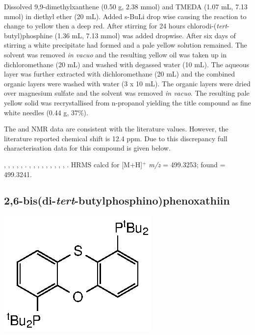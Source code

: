 Dissolved 9,9-dimethylxanthene (0.50 g, 2.38 mmol) and \gls{TMEDA} (1.07 mL, 7.13 mmol) in diethyl ether (20 mL).  Added s-BuLi drop wise causing the reaction to change to yellow then a deep red.  After stirring for 24 hours chlorodi-(\emph{tert}-butyl)phosphine (1.36 mL, 7.13 mmol) was added dropwise.  After six days of stirring a white precipitate had formed and a pale yellow solution remained.  The solvent was removed \emph{in vacuo} and the resulting yellow oil was taken up in dichloromethane (20 mL) and washed with degassed water (10 mL).  The aqueous layer was further extracted with dichloromethane (20 mL) and the combined organic layers were washed with water (3 x 10 mL).  The organic layers were dried over magnesium sulfate and the solvent was removed \emph{in vacuo}.  The resulting pale yellow solid was recrystallised from n-propanol yielding the title compound as fine white needles (0.44 g, 37\%).

The \proton{} and \carbon{} NMR data are consistent with the literature values.\cite{Mispelaere2005}  However, the literature reported \phosphorus{} chemical shift is 12.4 ppm.  Due to this discrepancy full characterisation data for this compound is given below.

,
,
,
,
,
.
,
,
,
,
,
,
,
,
,
.
HRMS calcd for  [M+H]$^+$ \emph{m/z} = 499.3253; found = 499.3241.



\subsection*{2,6-bis(di-\emph{tert}-butylphosphino)phenoxathiin}

\begin{structure}[h]
\begin{center}
\includegraphics{../Structures/Transthixantphos.eps}
\end{center}
\end{structure}

